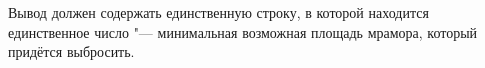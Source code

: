 Вывод должен содержать единственную строку, в которой находится единственное
число "--- минимальная возможная площадь мрамора, который придётся выбросить.


